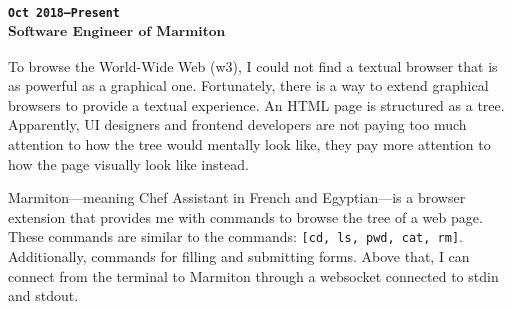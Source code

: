\subsubsection{\textsubscript{\uppercase{\texttt{Oct 2018--Present}}\\
Software Engineer of Marmiton
}
}
To browse the World-Wide Web (w3), I could not find a textual browser that is as 
powerful as a graphical one.
Fortunately, there is a way to extend graphical browsers to provide a textual 
experience.
An HTML page is structured as a tree.
Apparently, UI designers and frontend developers are not paying too much 
attention to how the tree would mentally look like, they pay more attention to 
how the page visually look like instead.

Marmiton---meaning Chef Assistant in French and Egyptian---is a browser 
extension that provides me with commands to browse the tree of a web page.
These commands are similar to the commands: \texttt{[cd, ls, pwd, cat, rm]}.
Additionally, commands for filling and submitting forms.
Above that, I can connect from the terminal to Marmiton through a websocket 
connected to stdin and stdout.
